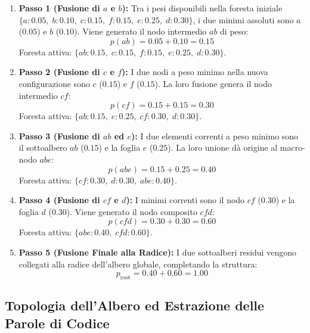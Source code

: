 \begin{enumerate}
  \item \textbf{Passo 1 (Fusione di $a$ e $b$):} 
  Tra i pesi disponibili nella foresta iniziale $\{a: 0.05, \; b: 0.10, \; c: 0.15, \; f: 0.15, \; e: 0.25, \; d: 0.30\}$, i due minimi assoluti sono $a$ ($0.05$) e $b$ ($0.10$). Viene generato il nodo intermedio $ab$ di peso:
  \begin{equation}
    p(ab) = 0.05 + 0.10 = 0.15
  \end{equation}
  Foresta attiva: $\{ab: 0.15, \; c: 0.15, \; f: 0.15, \; e: 0.25, \; d: 0.30\}$.

  \item \textbf{Passo 2 (Fusione di $c$ e $f$):} 
  I due nodi a peso minimo nella nuova configurazione sono $c$ ($0.15$) e $f$ ($0.15$). La loro fusione genera il nodo intermedio $cf$:
  \begin{equation}
    p(cf) = 0.15 + 0.15 = 0.30
  \end{equation}
  Foresta attiva: $\{ab: 0.15, \; e: 0.25, \; cf: 0.30, \; d: 0.30\}$.

  \item \textbf{Passo 3 (Fusione di $ab$ ed $e$):} 
  I due elementi correnti a peso minimo sono il sottoalbero $ab$ ($0.15$) e la foglia $e$ ($0.25$). La loro unione d\`a origine al macro-nodo $abe$:
  \begin{equation}
    p(abe) = 0.15 + 0.25 = 0.40
  \end{equation}
  Foresta attiva: $\{cf: 0.30, \; d: 0.30, \; abe: 0.40\}$.

  \item \textbf{Passo 4 (Fusione di $cf$ e $d$):} 
  I minimi correnti sono il nodo $cf$ ($0.30$) e la foglia $d$ ($0.30$). Viene generato il nodo composito $cfd$:
  \begin{equation}
    p(cfd) = 0.30 + 0.30 = 0.60
  \end{equation}
  Foresta attiva: $\{abe: 0.40, \; cfd: 0.60\}$.

  \item \textbf{Passo 5 (Fusione Finale alla Radice):} 
  I due sottoalberi residui vengono collegati alla radice dell'albero globale, completando la struttura:
  \begin{equation}
    p_{\text{root}} = 0.40 + 0.60 = 1.00
  \end{equation}
\end{enumerate}

\FloatBarrier
\subsection{Topologia dell'Albero ed Estrazione delle Parole di Codice}
\label{subsec:topologia-albero-huffman}

